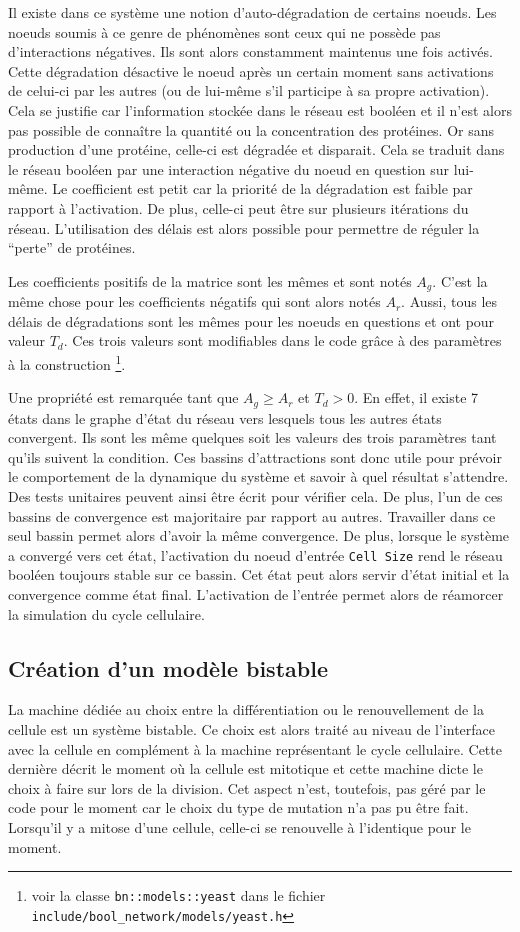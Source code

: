 \documentclass[11pt, a4paper]{article}
\begin{document}
Il existe dans ce système une notion d'auto-dégradation de certains noeuds. Les
noeuds soumis à ce genre de phénomènes sont ceux qui ne possède pas
d'interactions négatives. Ils sont alors constamment maintenus une fois
activés. Cette dégradation désactive le noeud après un certain moment sans
activations de celui-ci par les autres (ou de lui-même s'il participe à sa
propre activation). Cela se justifie car l'information stockée dans le réseau
est booléen et il n'est alors pas possible de connaître la quantité ou la
concentration des protéines. Or sans production d'une protéine, celle-ci est
d\'egradée et disparait. Cela se traduit dans le réseau booléen par une
interaction négative du noeud en question sur lui-même. Le coefficient est
petit car la priorité de la dégradation est faible par rapport à
l'activation. De plus, celle-ci peut être sur plusieurs itérations du réseau.
L'utilisation des délais est alors possible pour permettre de réguler la
``perte'' de protéines.

Les coefficients positifs de la matrice sont les mêmes et sont notés $A_g$.
C'est la même chose pour les coefficients négatifs qui sont alors notés $A_r$.
Aussi, tous les délais de dégradations sont les mêmes  pour les noeuds en
questions et ont pour valeur $T_d$. Ces trois valeurs sont modifiables dans le code grâce
à des paramètres à la construction \footnote{voir la classe
    \texttt{bn::models::yeast} dans le fichier
\texttt{include/bool\_network/models/yeast.h}}.

Une propriété est remarquée tant que $A_g \ge A_r$ et $T_d > 0$. En effet, il
existe 7 états dans le graphe d'état du réseau vers lesquels tous les autres
états convergent. Ils sont les même quelques soit les valeurs des trois
paramètres tant qu'ils suivent la condition. Ces bassins d'attractions sont
donc utile pour prévoir le comportement de la dynamique du système et savoir à
quel résultat s'attendre. Des tests unitaires peuvent ainsi être écrit pour
vérifier cela. De plus, l'un de ces bassins de convergence est majoritaire par
rapport au autres. Travailler dans ce seul bassin permet alors d'avoir la même
convergence. De plus, lorsque le système a convergé vers cet état, l'activation
du noeud d'entrée \texttt{Cell Size} rend le réseau booléen toujours stable sur
ce bassin. Cet état peut alors servir d'état initial et la convergence comme
état final. L'activation de l'entrée permet alors de réamorcer la simulation du
cycle cellulaire.

\subsection{Création d'un modèle bistable}
La machine dédiée au choix entre la différentiation ou le renouvellement de la
cellule est un système bistable. Ce choix est alors traité au niveau de
l'interface avec la cellule en complément à la machine représentant le cycle
cellulaire. Cette dernière décrit le moment où la cellule est mitotique et
cette machine dicte le choix à faire sur lors de la division. Cet aspect n'est,
toutefois, pas géré par le code pour le moment car le choix du type de mutation
n'a pas pu être fait. Lorsqu'il y a mitose d'une cellule, celle-ci se
renouvelle à l'identique pour le moment.
\end{document}

